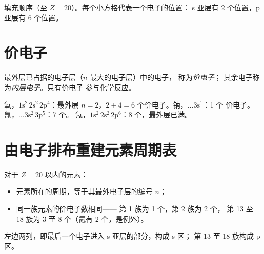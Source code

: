 \begin{omfigure}

{\small 填充顺序（至 $Z = 20$）。每个小方格代表一个电子的位置：
s 亚层有 2 个位置，p 亚层有 6 个位置。}
\end{omfigure}

\section{价电子}

\begin{definition}[价电子与内层电子]\label{def:g10:electron-shells:valence}
最外层已占据的电子层（$n$ 最大的电子层）中的电子，
称为\emph{价电子}；
其余电子称为\emph{内层电子}。只有价电子
参与化学反应。
\end{definition}

\begin{example}[数一数价电子]\label{ex:g10:electron-shells:count}
氧，$1\mathrm{s}^2\,2\mathrm{s}^2\,2\mathrm{p}^4$：最外层 $n =
2$，$2 + 4 = 6$ 个价电子。钠，$\ldots 3\mathrm{s}^1$：1 个
价电子。氯，$\ldots 3\mathrm{s}^2\,3\mathrm{p}^5$：7 个。
氖，$1\mathrm{s}^2\,2\mathrm{s}^2\,2\mathrm{p}^6$：8 个，最外层已满。
\end{example}

\section{由电子排布重建元素周期表}

\begin{proposition}[由电子排布得到周期与族]\label{prop:g10:electron-shells:table}
对于 $Z = 20$ 以内的元素：
\begin{itemize}
  \item 元素所在的周期，等于其最外电子层的编号 $n$；
  \item 同一族元素的价电子数相同——
        第 1 族为 1 个，第 2 族为 2 个，
        第 13 至 18 族为 3 至 8 个（氦有 2 个，是例外）。
\end{itemize}
左边两列，即最后一个电子进入 s 亚层的部分，构成 s 区；
第 13 至 18 族构成 p 区。
\end{proposition}

